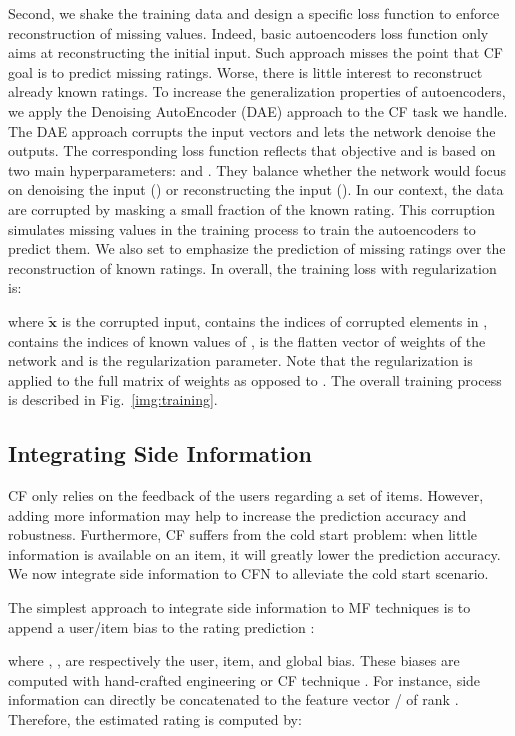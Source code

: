 \documentclass{article}
\newcommand{\mtx}[1]{\ensuremath{\mathbf{#1}}}
\begin{document}
Second, we shake the training data and design a specific loss function to enforce reconstruction of missing values. Indeed, basic autoencoders loss function only aims at reconstructing the initial input. Such approach misses the point that CF goal is to predict missing ratings. Worse, there is little interest to reconstruct already known ratings. To increase the generalization properties of autoencoders, we apply the Denoising AutoEncoder (DAE) approach \cite{Vincent2008} to the CF task we handle.
The DAE approach corrupts the input vectors and lets the network denoise the outputs. The corresponding loss function reflects that objective and is based on two main hyperparameters:  and . They balance whether the network would focus on denoising the input () or reconstructing the input (). In our context, the data are corrupted by masking a small fraction of the known rating.
This corruption simulates missing values in the training process to train the autoencoders to predict them.
We also set  to emphasize the prediction of missing ratings over the reconstruction of known ratings. 
In overall, the training loss with regularization is:

where \mtx{\tilde{x}} is the corrupted input,  contains the indices of corrupted elements in ,  contains the indices of known values of ,  is the flatten vector of weights of the network and  is the regularization parameter. Note that the regularization is applied to the full matrix of weights as opposed to \cite{Sedhain2015}. The overall training process is described in Fig.~\ref{img:training}.




\subsection{Integrating Side Information}
\label{sec:sideinfo}

CF only relies on the feedback of the users regarding a set of items. However, adding more information may help to increase the prediction accuracy and robustness. Furthermore, CF suffers from the cold start problem: when little information is available on an item, it will greatly lower the prediction accuracy. We now integrate side information to CFN to alleviate the cold start scenario. 

The simplest approach to integrate side information to MF techniques is to append a user/item bias to the rating prediction \cite{Koren2009}: 

where , ,  are respectively the user, item, and global bias. These biases are computed with hand-crafted engineering or CF technique \cite{Chen2012,Porteous2010,Rendle2010}. For instance, side information can directly be concatenated to the feature vector / of rank . Therefore, the estimated rating is computed by:
\end{document}

